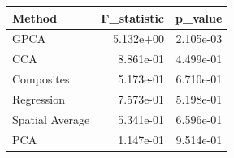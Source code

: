 \begin{tabular}{lrr}
\toprule
Method & F_statistic & p_value \\
\midrule
GPCA & 5.132e+00 & 2.105e-03 \\
CCA & 8.861e-01 & 4.499e-01 \\
Composites & 5.173e-01 & 6.710e-01 \\
Regression & 7.573e-01 & 5.198e-01 \\
Spatial Average & 5.341e-01 & 6.596e-01 \\
PCA & 1.147e-01 & 9.514e-01 \\
\bottomrule
\end{tabular}
